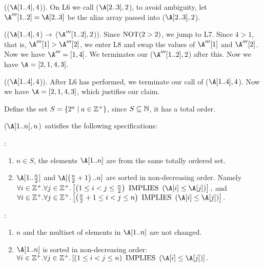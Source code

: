 \documentclass[11pt, sakura, night, 1in]{hw}
\begin{document}
(\AUX($\A[1..4], 4$)). On L6 we call \AUX($\A[2..3],2$), to avoid ambiguity, let $\A'''[1..2]=\A[2..3]$ be the alias array passed into \AUX($\A[2..3],2$).

(\AUX($\A[1..4], 4$) $\rightarrow$ \AUX($\A'''[1..2],2$)). Since $\mathrm{NOT}(2>2)$, we jump to L7. Since $4>1$, that is, $\A'''[1]>\A'''[2]$, we enter L8 and swap the values of $\A'''[1]$ and $\A'''[2]$. Now we have $\A'''=[1,4]$. We terminates our \AUX($\A'''[1..2],2$) after this. Now we have $\A=[2,1,4,3]$.

(\AUX($\A[1..4], 4$)). After L6 has performed, we terminate our call of \AUX($\A[1..4],4$). Now we have $\A=[2,1,4,3]$, which justifies our claim.   

\begin{comment}
    
\newq{2}{
    Give specifications that are satisfied by \AUX\, and from which you can prove that \SRT\, is a correct sorting algorithm when $n$ is a power of 2.
}
\end{comment}

Define the set $S=\{2^a\mid a\in\mathbb{Z}^+\}$, since $S\subseteq\mathbb{N}$, it has a total order.

 \AUX($\A[1..n], n$)\, satisfies the following specifications:

\Precon{}:

\begin{enumerate}
    \item $n\in S$, the elements $\A[1..n]$ are from the same totally ordered set.
    \item $\A[1..\frac{n}2]$ and $\A[\bra{\frac{n}2+1}..n]$ are sorted in non-decreasing order. Namely\\ $\forall i\in\Z^+. \forall j\in\Z^+. \sqrbra{\bra{1\le i<j\le \frac{n}{2}}\iimplies \bra{\A[i]\le \A[j]}},$ and \\$\forall i\in\Z^+. \forall j\in\Z^+. \sqrbra{\bra{\frac{n}{2}+1\le i<j\le n}\iimplies \bra{\A[i]\le \A[j]}}.$
\end{enumerate}

\Postcon{}:

\begin{enumerate}
    \item $n$ and the multiset of elements in $\A[1..n]$ are not changed. %
    \item $\A[1..n]$ is sorted in non-decreasing order: $\forall i\in\Z^+. \forall j\in\Z^+. \sqrbra{\bra{1\le i<j\le n}\iimplies \bra{\A[i]\le \A[j]}}.$
\end{enumerate}
\end{document}
